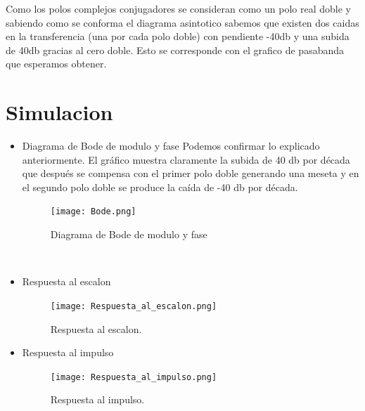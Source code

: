 \documentclass[11pt]{diazessay} %
\begin{document}
Como los polos complejos conjugadores se consideran como un polo real doble y sabiendo como se conforma el diagrama asintotico sabemos que existen
dos caidas en la transferencia (una por cada polo doble) con pendiente -40db y una subida de 40db gracias al cero doble. Esto se corresponde con el
grafico de pasabanda que esperamos obtener.

\newpage
\section*{Simulacion}
\begin{itemize}
\item Diagrama de Bode de modulo y fase
Podemos confirmar lo explicado anteriormente. El gráfico muestra claramente la subida de 40 db por década que después se compensa con el primer polo doble generando una meseta y en el segundo polo doble se produce la caída de -40 db por década.\\
\begin{figure}[h]
	\centering
	\texttt{[image: Bode.png]}
\caption{Diagrama de Bode de modulo y fase}
\end{figure}\\
\newpage
\item Respuesta al escalon
\begin{figure}[h]
	\centering
	\texttt{[image: Respuesta\_al\_escalon.png]}
\caption{Respuesta al escalon.}
\end{figure}
\newpage
\item Respuesta al impulso
\begin{figure}[h]
	\centering
	\texttt{[image: Respuesta\_al\_impulso.png]}
\caption{Respuesta al impulso.}
\end{figure}

\end{itemize}

\end{document}
